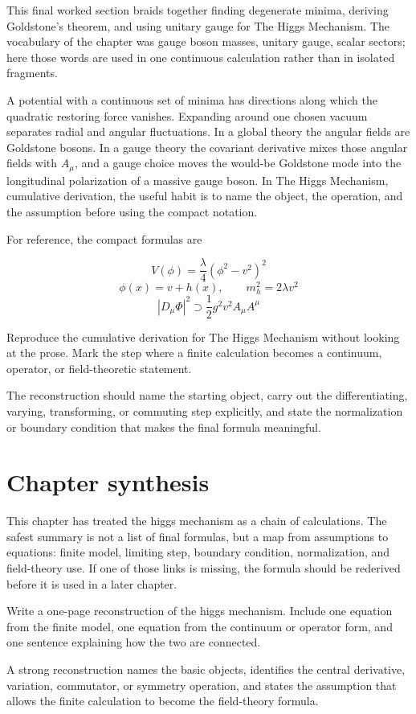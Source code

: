 This final worked section braids together finding degenerate minima, deriving Goldstone's theorem, and using unitary gauge for The Higgs Mechanism.  The vocabulary of the chapter was gauge boson masses, unitary gauge, scalar sectors; here those words are used in one continuous calculation rather than in isolated fragments.

A potential with a continuous set of minima has directions along which the quadratic restoring force vanishes.  Expanding around one chosen vacuum separates radial and angular fluctuations.  In a global theory the angular fields are Goldstone bosons.  In a gauge theory the covariant derivative mixes those angular fields with \(A_\mu\), and a gauge choice moves the would-be Goldstone mode into the longitudinal polarization of a massive gauge boson.  In The Higgs Mechanism, cumulative derivation, the useful habit is to name the object, the operation, and the assumption before using the compact notation.

For reference, the compact formulas are

\[
  V(\phi)=\frac{\lambda}{4}(\phi^2-v^2)^2
\]
\[
  \phi(x)=v+h(x),\qquad m_h^2=2\lambda v^2
\]
\[
  |D_\mu\Phi|^2\supset \frac12g^2v^2A_\mu A^\mu
\]

\begin{exercise}
Reproduce the cumulative derivation for The Higgs Mechanism without looking at the prose.  Mark the step where a finite calculation becomes a continuum, operator, or field-theoretic statement.
\begin{answer}
The reconstruction should name the starting object, carry out the differentiating, varying, transforming, or commuting step explicitly, and state the normalization or boundary condition that makes the final formula meaningful.
\end{answer}
\end{exercise}



\section{Chapter synthesis}

This chapter has treated the higgs mechanism as a chain of calculations.  The safest summary is not a list of final formulas, but a map from assumptions to equations: finite model, limiting step, boundary condition, normalization, and field-theory use.  If one of those links is missing, the formula should be rederived before it is used in a later chapter.

\begin{exercise}
Write a one-page reconstruction of the higgs mechanism.  Include one equation from the finite model, one equation from the continuum or operator form, and one sentence explaining how the two are connected.
\begin{answer}
A strong reconstruction names the basic objects, identifies the central derivative, variation, commutator, or symmetry operation, and states the assumption that allows the finite calculation to become the field-theory formula.
\end{answer}
\end{exercise}
